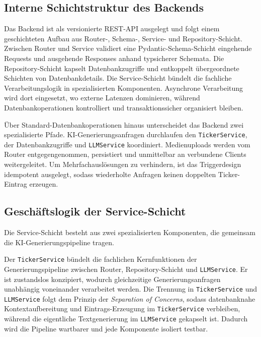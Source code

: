 \subsection{Interne Schichtstruktur des Backends}\label{interne-schichtstruktur}

Das Backend ist als versionierte REST-API ausgelegt und folgt einem geschichteten Aufbau aus Router-, Schema-, Service- und Repository-Schicht. Zwischen Router und Service validiert eine Pydantic-Schema-Schicht eingehende Requests und ausgehende Responses anhand typsicherer Schemata. Die Repository-Schicht kapselt Datenbankzugriffe und entkoppelt übergeordnete Schichten von Datenbankdetails. Die Service-Schicht bündelt die fachliche Verarbeitungslogik in spezialisierten Komponenten. Asynchrone Verarbeitung wird dort eingesetzt, wo externe Latenzen dominieren, während Datenbankoperationen kontrolliert und transaktionssicher organisiert bleiben.

Über Standard-Datenbankoperationen hinaus unterscheidet das Backend zwei spezialisierte Pfade. KI-Generierungsanfragen durchlaufen den \texttt{TickerService}, der Datenbankzugriffe und \texttt{LLMService} koordiniert. Medienuploads werden vom Router entgegengenommen, persistiert und unmittelbar an verbundene Clients weitergeleitet. Um Mehrfachauslösungen zu verhindern, ist das Triggerdesign idempotent ausgelegt, sodass wiederholte Anfragen keinen doppelten Ticker-Eintrag erzeugen.

\subsection{Geschäftslogik der Service-Schicht}\label{llm-service-architektur}

Die Service-Schicht besteht aus zwei spezialisierten Komponenten, die gemeinsam die KI-Generierungspipeline tragen.

Der \texttt{TickerService} bündelt die fachlichen Kernfunktionen der Generierungspipeline zwischen Router, Repository-Schicht und \texttt{LLMService}. Er ist zustandslos konzipiert, wodurch gleichzeitige Generierungsanfragen unabhängig voneinander verarbeitet werden. Die Trennung in \texttt{TickerService} und \texttt{LLMService} folgt dem Prinzip der \emph{Separation of Concerns}, sodass datenbanknahe Kontextaufbereitung und Eintrags-Erzeugung im \texttt{TickerService} verbleiben, während die eigentliche Textgenerierung im \texttt{LLMService} gekapselt ist. Dadurch wird die Pipeline wartbarer und jede Komponente isoliert testbar.

